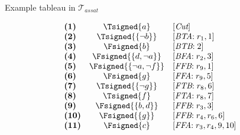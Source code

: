 \begin{frame}{Example tableau in $\mathcal{T}_{\textit{assat}}$}
\TableauExampleProgram
\begin{center}
\begin{minipage}[t]{16cm}
\tiny
\begin{minipage}[t]{4.5cm}
\[
\hspace{-0.3cm}
\begin{array}{lcl}
\textbf{(1)}                                       &
  \Tsigned{a}                                      &
  [\textit{Cut}]                                   \\
\textbf{(2)}                                       &
  \Tsigned{\{\neg b\}}                     &
  [\textit{BTA}{:}\; r_1, \text{1}]                \\
\textbf{(3)}                                       &
  \Fsigned{b}                                      &
  [\textit{BTB}{:}\; \text{2}]                     \\
\textbf{(4)}                                       &
  \Fsigned{\{d,\neg a\}}                   &
  [\textit{BFA}{:}\;r_2, \text{3}]                 \\
\textbf{(5)}                                       &
  \Fsigned{\{\neg a,\neg f\}}      &
  [\textit{FFB}{:}\;r_9, \text{1}]                 \\
\textbf{(6)}                                       &
  \Fsigned{g}                                      &
  [\textit{FFA}{:}\;r_9, \text{5}]                 \\
\textbf{(7)}                                       &
  \Tsigned{\{\neg g\}}                     &
  [\textit{FTB}{:}\;r_8, \text{6}]                 \\
\textbf{(8)}                                       &
  \Tsigned{f}                                      &
  [\textit{FTA}{:}\;r_8, \text{7}]                 \\
\textbf{(9)}                                       &
  \Fsigned{\{b,d\}}                                &
  [\textit{FFB}{:}\;r_3, \text{3}]                 \\
\textbf{(10)}                                      &
  \Fsigned{\{g\}}                                  &
  [\textit{FFB}{:}\;r_4, r_6, \text{6}]            \\
\textbf{(11)}                                      &
  \Fsigned{c}                                      &
  [\textit{FFA}{:}\;r_3,r_4, \text{9}, \text{10}]  \\

\end{array}\]
\end{minipage}
\end{minipage}
\end{center}
\end{frame}
